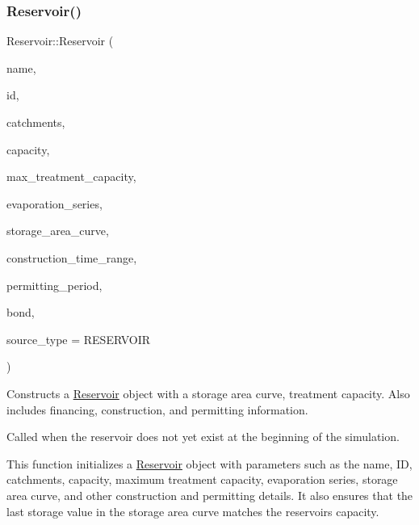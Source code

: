 \subsubsection{\texorpdfstring{Reservoir()}{Reservoir()}\hspace{0.1cm}{\footnotesize\ttfamily [2/9]}}
{\footnotesize\ttfamily Reservoir\+::\+Reservoir (\begin{DoxyParamCaption}\item[{const char $\ast$}]{name,  }\item[{const int}]{id,  }\item[{const vector$<$ \mbox{\hyperlink{classCatchment}{Catchment}} $\ast$$>$ \&}]{catchments,  }\item[{const double}]{capacity,  }\item[{const double}]{max\+\_\+treatment\+\_\+capacity,  }\item[{Evaporation\+Series \&}]{evaporation\+\_\+series,  }\item[{Data\+Series $\ast$}]{storage\+\_\+area\+\_\+curve,  }\item[{const vector$<$ double $>$ \&}]{construction\+\_\+time\+\_\+range,  }\item[{double}]{permitting\+\_\+period,  }\item[{\mbox{\hyperlink{classBond}{Bond}} \&}]{bond,  }\item[{int}]{source\+\_\+type = {\ttfamily RESERVOIR} }\end{DoxyParamCaption})}



Constructs a \mbox{\hyperlink{classReservoir}{Reservoir}} object with a storage area curve, treatment capacity. Also includes financing, construction, and permitting information. 

Called when the reservoir does not yet exist at the beginning of the simulation.

This function initializes a \mbox{\hyperlink{classReservoir}{Reservoir}} object with parameters such as the name, ID, catchments, capacity, maximum treatment capacity, evaporation series, storage area curve, and other construction and permitting details. It also ensures that the last storage value in the storage area curve matches the reservoir\textquotesingle{}s capacity.


